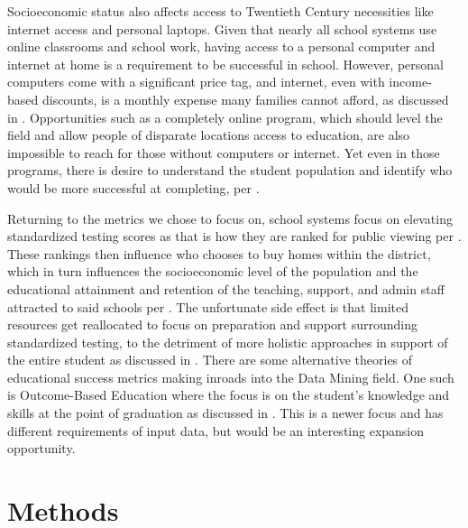 \documentclass[man,floatsintext]{apa6} %
\begin{document}
Socioeconomic status also affects access to Twentieth Century necessities like internet access and personal laptops. Given that nearly all school systems use online classrooms and school work, having access to a personal computer and internet at home is a requirement to be successful in school. However, personal computers come with a significant price tag, and internet, even with income-based discounts, is a monthly expense many families cannot afford, as discussed in \cite{sesinternet}. Opportunities such as a completely online program, which should level the field and allow people of disparate locations access to education, are also impossible to reach for those without computers or internet. Yet even in those programs, there is desire to understand the student population and identify who would be more successful at completing, per \cite{DistLearnML}.

Returning to the metrics we chose to focus on, school systems focus on elevating standardized testing scores as that is how they are ranked for public viewing per \cite{linnetal}. These rankings then influence who chooses to buy homes within the district, which in turn influences the socioeconomic level of the population and the educational attainment and retention of the teaching, support, and admin staff attracted to said schools per \cite{perry2010does}. The unfortunate side effect is that limited resources get reallocated to focus on preparation and support surrounding standardized testing, to the detriment of more holistic approaches in support of the entire student as discussed in \cite{cradle}. There are some alternative theories of educational success metrics making inroads into the Data Mining field. One such is Outcome-Based Education where the focus is on the student's knowledge and skills at the point of graduation as discussed in \cite{studentPerfOBE}. This is a newer focus and has different requirements of input data, but would be an interesting expansion opportunity. 

\section{Methods}
\end{document}
